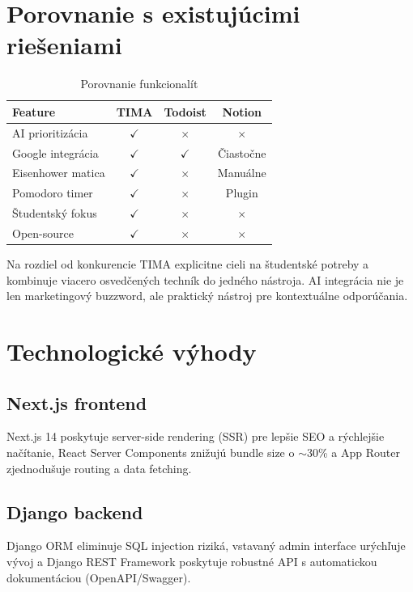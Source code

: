 \documentclass[10pt,twocolumn,twoside,slovak,a4paper]{article}
\begin{document}
\section{Porovnanie s existujúcimi riešeniami}

\begin{table}[h]
\centering
\small
\begin{tabular}{|l|c|c|c|}
\hline
\textbf{Feature} & \textbf{TIMA} & \textbf{Todoist} & \textbf{Notion} \\
\hline
AI prioritizácia & $\checkmark$ & $\times$ & $\times$ \\
Google integrácia & $\checkmark$ & $\checkmark$ & Čiastočne \\
Eisenhower matica & $\checkmark$ & $\times$ & Manuálne \\
Pomodoro timer & $\checkmark$ & $\times$ & Plugin \\
Študentský fokus & $\checkmark$ & $\times$ & $\times$ \\
Open-source & $\checkmark$ & $\times$ & $\times$ \\
\hline
\end{tabular}
\caption{Porovnanie funkcionalít}
\end{table}

Na rozdiel od konkurencie TIMA explicitne cieli na študentské potreby a kombinuje viacero osvedčených techník do jedného nástroja. AI integrácia nie je len marketingový buzzword, ale praktický nástroj pre kontextuálne odporúčania.

\section{Technologické výhody}

\subsection{Next.js frontend}
Next.js 14 poskytuje server-side rendering (SSR) pre lepšie SEO a rýchlejšie načítanie, React Server Components znižujú bundle size o $\sim$30\% a App Router zjednodušuje routing a data fetching.

\subsection{Django backend}
Django ORM eliminuje SQL injection riziká, vstavaný admin interface urýchľuje vývoj a Django REST Framework poskytuje robustné API s automatickou dokumentáciou (OpenAPI/Swagger).
\end{document}
